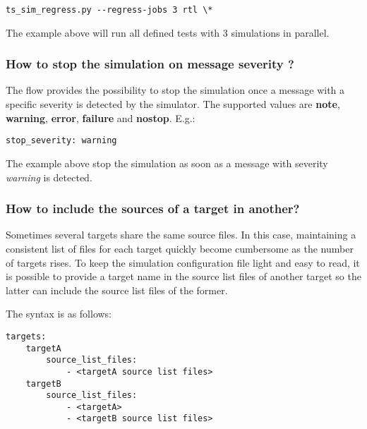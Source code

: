 \documentclass{tropic_design_spec}
\begin{document}
\begin{lstlisting}
ts_sim_regress.py --regress-jobs 3 rtl \*
\end{lstlisting}

The example above will run all defined tests with 3 simulations in parallel.


\subsubsection{How to stop the simulation on message severity ?}
\label{sec:how-to-stop-the-simulation-on-message-severity}

The flow provides the possibility to stop the simulation once a message with a specific
severity is detected by the simulator. The supported values are \textbf{note},
\textbf{warning}, \textbf{error}, \textbf{failure} and \textbf{nostop}. E.g.:

\begin{lstlisting}
stop_severity: warning
\end{lstlisting}

The example above stop the simulation as soon as a message with severity
\textit{warning} is detected.


\subsubsection{How to include the sources of a target in another?}
\label{sec:how-to-include-the-sources-of-a-target-in-another}

Sometimes several targets share the same source files. In this case, maintaining a
consistent list of files for each target quickly become cumbersome as the number of
targets rises. To keep the simulation configuration file light and easy to read, it is
possible to provide a target name in the source list files of another target so the
latter can include the source list files of the former.

The syntax is as follows:
\begin{lstlisting}
targets:
    targetA
        source_list_files:
            - <targetA source list files>
    targetB
        source_list_files:
            - <targetA>
            - <targetB source list files>
\end{lstlisting}
\end{document}
